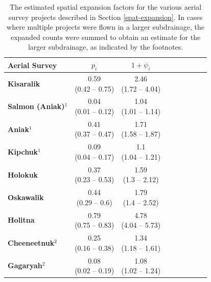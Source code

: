 \documentclass[12pt,]{book}
\theoremstyle{definition}
\theoremstyle{definition}
\theoremstyle{definition}
\theoremstyle{remark}
\begin{document}
\clearpage

\singlespacing

\begin{table}[H]

\caption{\label{tab:spat-expand-table}The estimated spatial expansion factors for the various aerial survey projects described in Section \ref{spat-expansion}.
      In cases where multiple projects were flown in a larger subdrainage, the expanded counts
      were summed to obtain an estimate for the larger subdrainage, as indicated by the footnotes.}
\centering
\begin{tabular}[t]{>{\bfseries}lcclcclcc}
\toprule
Aerial Survey & $p_i$ & $1 + \psi_i$\\
\midrule
Kisaralik & \makecell[c]{0.59\\(0.42 -- 0.75)} & \makecell[c]{2.46\\(1.72 -- 4.04)}\\
Salmon (Aniak)$^1$ & \makecell[c]{0.04\\(0.01 -- 0.12)} & \makecell[c]{1.04\\(1.01 -- 1.14)}\\
Aniak$^1$ & \makecell[c]{0.41\\(0.37 -- 0.47)} & \makecell[c]{1.71\\(1.58 -- 1.87)}\\
Kipchuk$^1$ & \makecell[c]{0.09\\(0.04 -- 0.17)} & \makecell[c]{1.1\\(1.04 -- 1.21)}\\
Holokuk & \makecell[c]{0.37\\(0.23 -- 0.53)} & \makecell[c]{1.59\\(1.3 -- 2.12)}\\
\addlinespace
Oskawalik & \makecell[c]{0.44\\(0.29 -- 0.6)} & \makecell[c]{1.79\\(1.4 -- 2.52)}\\
Holitna & \makecell[c]{0.79\\(0.75 -- 0.83)} & \makecell[c]{4.78\\(4.04 -- 5.73)}\\
Cheeneetnuk$^2$ & \makecell[c]{0.25\\(0.16 -- 0.38)} & \makecell[c]{1.34\\(1.18 -- 1.61)}\\
Gagaryah$^2$ & \makecell[c]{0.08\\(0.02 -- 0.19)} & \makecell[c]{1.08\\(1.02 -- 1.24)}\\

\end{tabular}
\end{table}
\end{document}
